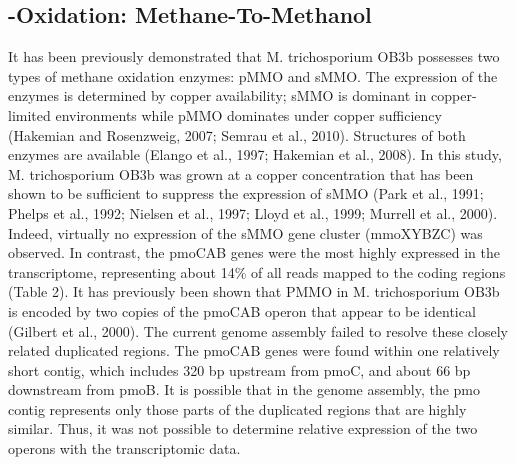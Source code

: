 

\subsection{-Oxidation: Methane-To-Methanol}
It has been previously demonstrated that M. trichosporium OB3b possesses two types of methane oxidation enzymes: pMMO and sMMO.
The expression of the enzymes is determined by copper availability; sMMO is dominant in copper-limited environments while pMMO dominates under copper sufficiency (Hakemian and Rosenzweig, 2007; Semrau et al., 2010).
Structures of both enzymes are available (Elango et al., 1997; Hakemian et al., 2008).
In this study, M. trichosporium OB3b was grown at a copper concentration that has been shown to be sufficient to suppress the expression of sMMO (Park et al., 1991; Phelps et al., 1992; Nielsen et al., 1997; Lloyd et al., 1999; Murrell et al., 2000).
Indeed, virtually no expression of the sMMO gene cluster (mmoXYBZC) was observed.
In contrast, the pmoCAB genes were the most highly expressed in the transcriptome, representing about 14\% of all reads mapped to the coding regions (Table 2).
It has previously been shown that PMMO in M. trichosporium OB3b is encoded by two copies of the pmoCAB operon that appear to be identical (Gilbert et al., 2000).
The current genome assembly failed to resolve these closely related duplicated regions.
The pmoCAB genes were found within one relatively short contig, which includes 320 bp upstream from pmoC, and about 66 bp downstream from pmoB.
It is possible that in the genome assembly, the pmo contig represents only those parts of the duplicated regions that are highly similar.
Thus, it was not possible to determine relative expression of the two operons with the transcriptomic data.

